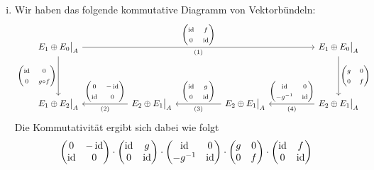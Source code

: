 \begin{beweis}
\mbox{ }
\begin{enumerate}[(i)]
	\item Wir haben das folgende kommutative Diagramm von Vektorbündeln:
	\[
		\begin{tikzcd}[ampersand replacement=\&,row sep=4.5em,column sep=5.2em]
			E_1 \oplus E_0\big|_A \ar[rrr,"{\begin{pmatrix} \id & f \\ 0 & \id \end{pmatrix}}","\text{(1)}"'] \ar[d,"{\begin{pmatrix} \id & 0 \\ 0 & g \circ f \end{pmatrix}}"'] 
			\& \& \& E_1 \oplus E_0\big|_A \ar[d,"{\begin{pmatrix} g & 0 \\ 0 & f \end{pmatrix}}"] \\
			E_1 \oplus E_2\big|_A \& E_2 \oplus E_1\big|_A \lar["{\begin{pmatrix} 0 & -\id \\ \id & 0 \end{pmatrix}}"',"\text{(2)}"]
			\& E_2 \oplus E_1\big|_A \lar["{\begin{pmatrix} \id & g \\ 0 & \id \end{pmatrix}}"',"\text{(3)}"]
			\& E_2 \oplus E_1\big|_A \lar["{\begin{pmatrix} \id & 0 \\ - g^{-1} & \id \end{pmatrix}}"',"\text{(4)}"]
		\end{tikzcd}
	\]
	Die Kommutativität ergibt sich dabei wie folgt
	\begin{align*}
		&\begin{pmatrix} 0 & -\id \\ \id & 0 \end{pmatrix} \cdot 
		\begin{pmatrix} \id & g \\ 0 & \id \end{pmatrix} \cdot 
		\begin{pmatrix} \id & 0 \\ - g^{-1} & \id \end{pmatrix} \cdot 
		\begin{pmatrix} g & 0 \\ 0 & f \end{pmatrix} \cdot 
		\begin{pmatrix} \id & f \\ 0 & \id \end{pmatrix} \\

\end{align*}
\end{enumerate}
\end{beweis}

